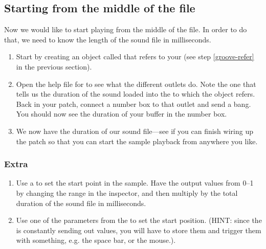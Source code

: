 \subsection{Starting from the middle of the file}

Now we would like to start playing from the middle of the file.  In order to do that, we need
to know the length of the sound file in milliseconds.

\begin{enumerate}
\item Start by creating an object called  that refers to your  
(see step \ref{groove-refer} in the previous section).

\item Open the help file for  to see what the different outlets do.  Note the one 
that tells us the duration of the sound loaded into the  to which
the object refers.  Back in your patch, connect a number box to that outlet and send 
a bang.  You should now see the duration of your buffer in the number box.

\item We now have the duration of our sound file---see if you can 
finish wiring up the patch so that you can start the sample playback from anywhere you like.
\end{enumerate}











\subsubsection{Extra}

\begin{enumerate}
\item Use a  to set the start point in the sample.  Have the 
output values from 0--1 by changing the range in the inspector, and then multiply by the 
total duration of the sound file in milliseconds.

\item Use one of the parameters from the \gt{} to set the start position.  (HINT:  since
the \gt{} is constantly sending out values, you will have to store them and trigger them 
with something, e.g. the space bar, or the mouse.).
\end{enumerate}
















